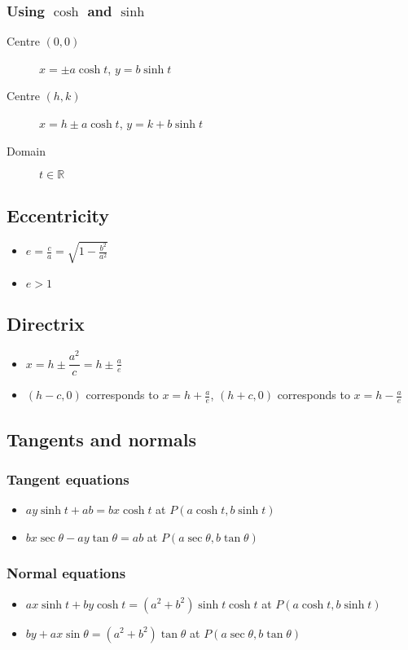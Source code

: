 \subsubsection{Using $\cosh$ and $\sinh$}

\begin{description}
    \item[Centre $(0,0)$] $x=\pm a\cosh t$, $y=b\sinh t$
    \item[Centre $(h,k)$] $x=h\pm a\cosh t$, $y=k+b\sinh t$
    \item[Domain] $t \in \mathbb{R}$
\end{description}
\subsection{Eccentricity}
\begin{itemize}
    \item $e=\frac{c}{a}=\sqrt{1-\frac{b^2}{a^2}}$
    \item $e>1$
\end{itemize}
\subsection{Directrix}
\begin{itemize}
    \item $x=h\pm \dfrac{a^2}{c} = h\pm\frac{a}{e}$
    \item $(h-c, 0)$ corresponds to $x=h+\frac{a}{e}$, $(h+c, 0)$ corresponds to $x=h-\frac{a}{e}$
\end{itemize}
\subsection{Tangents and normals}
\subsubsection{Tangent equations}
\begin{itemize}
    \item $ay\sinh t + ab = bx\cosh t$ at $P(a\cosh t, b\sinh t)$
    \item $bx\sec\theta-ay\tan\theta = ab$ at $P(a\sec\theta, b\tan\theta)$
\end{itemize}
\subsubsection{Normal equations}
\begin{itemize}
    \item $ax\sinh t + by\cosh t = (a^2+b^2)\sinh t\cosh t$ at $P(a\cosh t, b\sinh t)$
    \item $by + ax\sin\theta = (a^2+b^2)\tan\theta$ at $P(a\sec\theta, b\tan\theta)$
\end{itemize}

